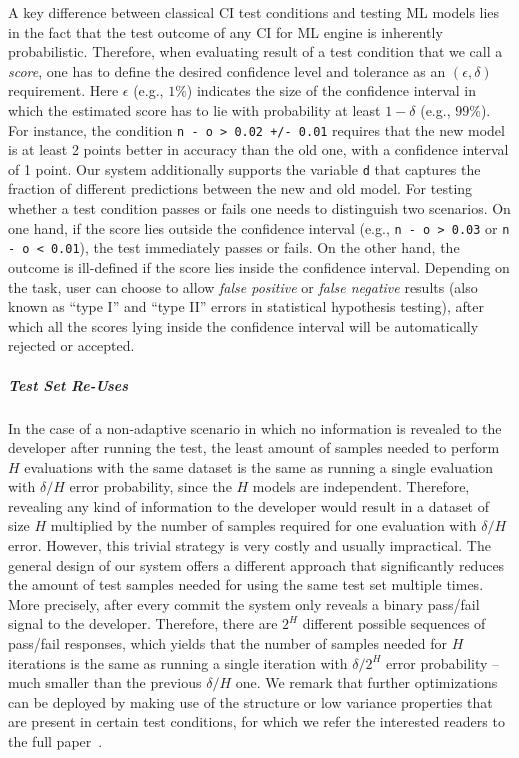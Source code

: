 \documentclass[11pt]{article}
\begin{document}
A key difference between classical CI test conditions and testing ML models lies in the fact that the test outcome of any CI for ML engine is inherently probabilistic. Therefore, when evaluating result of a test condition that we call a \textit{score}, one has to define the desired confidence level and tolerance as an $(\epsilon,\delta)$ requirement. Here $\epsilon$ (e.g., $1\%$) indicates the size of the confidence interval in which the estimated score has to lie with probability at least $1-\delta$ (e.g., $99\%$). For instance, the condition \verb|n - o > 0.02 +/- 0.01| requires that the new model is at least 2 points better in accuracy than the old one, with a confidence interval of 1 point. Our system additionally supports the variable \verb|d| that captures the fraction of different predictions between the new and old model.  
For testing whether a test condition passes or fails one needs to distinguish two scenarios. On one hand, if the score lies outside the confidence interval (e.g., \verb|n - o > 0.03| or \verb|n - o < 0.01|), the test immediately passes or fails.
On the other hand, the outcome is ill-defined if the score lies inside the confidence interval. Depending on the task, user can choose to allow \emph{false positive} or \emph{false negative} results (also known as ``type I'' and ``type II'' errors 
in statistical hypothesis testing), after which all the scores lying inside the confidence interval will be automatically rejected or accepted.


\subparagraph{Test Set Re-Uses}

In the case of a non-adaptive scenario in which no information is revealed to the developer after running the test, the least amount of samples needed to perform $H$ evaluations with the same dataset is the same as running a single evaluation with $\delta / H$ error probability, since the $H$ models are independent.
Therefore, revealing any kind of information to the developer would result in a dataset of size $H$ multiplied by the number of samples required for one evaluation with $\delta / H$ error. However, this trivial strategy is very costly and usually impractical. The general design of our system offers a different approach that significantly reduces the amount of test samples needed for using the same test set multiple times. More precisely, after every commit the system only reveals a binary pass/fail signal to the developer. Therefore, there are $2^H$ different possible sequences of pass/fail responses, 
which yields that the number of samples needed for $H$ iterations is the same as running a single iteration with $\delta / 2^H$ error probability -- much smaller than the previous $\delta / H$ one. 
We remark that further optimizations can be deployed by making use of the structure or low variance properties that are present in certain test conditions, for which we refer the interested readers to the full paper~\cite{renggli2019continuous}.
\end{document}
